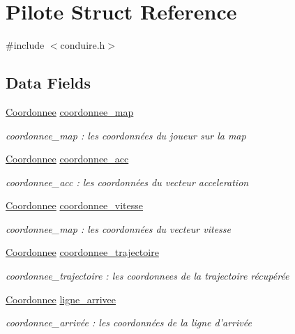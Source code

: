 \hypertarget{struct_pilote}{\section{Pilote Struct Reference}
\label{struct_pilote}
}


{\ttfamily \#include $<$conduire.\-h$>$}

\subsection*{Data Fields}
\begin{DoxyCompactItemize}
\item 
\hyperlink{struct_coordonnee}{Coordonnee} \hyperlink{struct_pilote_a52837bcb5b3f3ad927339433eff60951}{coordonnee\-\_\-map}
\begin{DoxyCompactList}\small\item\em coordonnee\-\_\-map \-: les coordonnées du joueur sur la map \end{DoxyCompactList}\item 
\hyperlink{struct_coordonnee}{Coordonnee} \hyperlink{struct_pilote_a1411a5d05b90490662441200e1c4e40d}{coordonnee\-\_\-acc}
\begin{DoxyCompactList}\small\item\em coordonnee\-\_\-acc \-: les coordonnées du vecteur acceleration \end{DoxyCompactList}\item 
\hyperlink{struct_coordonnee}{Coordonnee} \hyperlink{struct_pilote_a7b1edc3a7ac0ac9b74224d7c2fbb2bac}{coordonnee\-\_\-vitesse}
\begin{DoxyCompactList}\small\item\em coordonnee\-\_\-map \-: les coordonnées du vecteur vitesse \end{DoxyCompactList}\item 
\hyperlink{struct_coordonnee}{Coordonnee} \hyperlink{struct_pilote_a86f53b7691951b4acc0c82a6a35f1d6b}{coordonnee\-\_\-trajectoire}
\begin{DoxyCompactList}\small\item\em coordonnee\-\_\-trajectoire \-: les coordonnees de la trajectoire récupérée \end{DoxyCompactList}\item 
\hyperlink{struct_coordonnee}{Coordonnee} \hyperlink{struct_pilote_a1ae9305296c689ff4b27a5fcc132a7cd}{ligne\-\_\-arrivee}
\begin{DoxyCompactList}\small\item\em coordonnee\-\_\-arrivée \-: les coordonnées de la ligne d'arrivée \end{DoxyCompactList}\item 

\end{DoxyCompactItemize}
